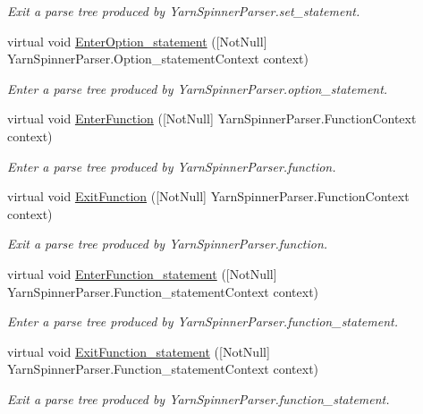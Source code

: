 \begin{DoxyCompactItemize}
\begin{DoxyCompactList}\small\item\em Exit a parse tree produced by Yarn\-Spinner\-Parser.\-set\-\_\-statement. \end{DoxyCompactList}\item 
virtual void \hyperlink{a00196_a2d0f9144a167601309e785868bc9c4cb}{Enter\-Option\-\_\-statement} (\mbox{[}Not\-Null\mbox{]} Yarn\-Spinner\-Parser.\-Option\-\_\-statement\-Context context)
\begin{DoxyCompactList}\small\item\em Enter a parse tree produced by Yarn\-Spinner\-Parser.\-option\-\_\-statement. \end{DoxyCompactList}\item 
virtual void \hyperlink{a00196_ae55a7ade788bb17bdb6b52522e181098}{Enter\-Function} (\mbox{[}Not\-Null\mbox{]} Yarn\-Spinner\-Parser.\-Function\-Context context)
\begin{DoxyCompactList}\small\item\em Enter a parse tree produced by Yarn\-Spinner\-Parser.\-function. \end{DoxyCompactList}\item 
virtual void \hyperlink{a00196_a1cf7a34cdb2d3604ce59f8428c720013}{Exit\-Function} (\mbox{[}Not\-Null\mbox{]} Yarn\-Spinner\-Parser.\-Function\-Context context)
\begin{DoxyCompactList}\small\item\em Exit a parse tree produced by Yarn\-Spinner\-Parser.\-function. \end{DoxyCompactList}\item 
virtual void \hyperlink{a00196_a812a7fc8d3e7d9d94dc0a2919fa19d7a}{Enter\-Function\-\_\-statement} (\mbox{[}Not\-Null\mbox{]} Yarn\-Spinner\-Parser.\-Function\-\_\-statement\-Context context)
\begin{DoxyCompactList}\small\item\em Enter a parse tree produced by Yarn\-Spinner\-Parser.\-function\-\_\-statement. \end{DoxyCompactList}\item 
virtual void \hyperlink{a00196_a51a618b740ae76bef859c69cf1f35786}{Exit\-Function\-\_\-statement} (\mbox{[}Not\-Null\mbox{]} Yarn\-Spinner\-Parser.\-Function\-\_\-statement\-Context context)
\begin{DoxyCompactList}\small\item\em Exit a parse tree produced by Yarn\-Spinner\-Parser.\-function\-\_\-statement. \end{DoxyCompactList}\item 

\end{DoxyCompactItemize}
